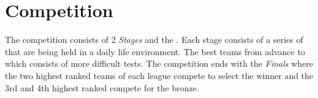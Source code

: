 \section{Competition}
The competition consists of 2 \emph{Stages} and the . Each stage consists of a series of  that are being held in a daily life environment. The best teams from  advance to  which consists of more difficult tests. The competition ends with the \emph{Finals} where the two highest ranked teams of each league compete to select the winner and the 3rd and 4th highest ranked compete for the bronze.